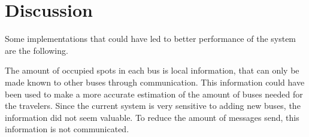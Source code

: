 \section{Discussion}

Some implementations that could have led to better performance of the system are the following.

The amount of occupied spots in each bus is local information, that can only be made known to other buses through communication. This information could have been used to make a more accurate estimation of the amount of buses needed for the travelers. Since the current system is very sensitive to adding new buses, the information did not seem valuable. To reduce the amount of messages send, this information is not communicated.
